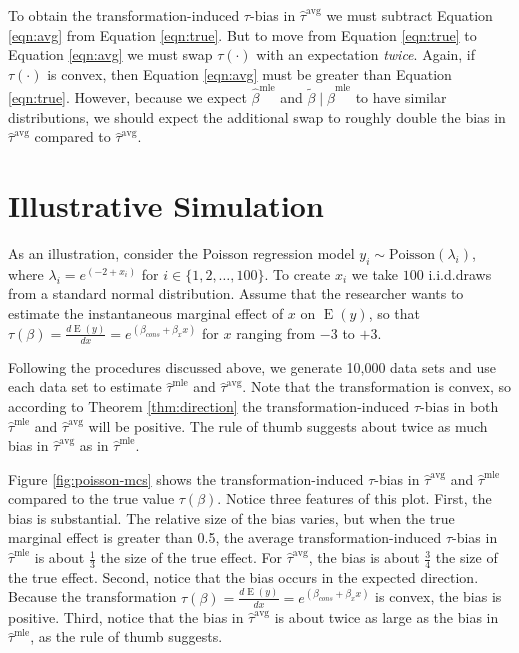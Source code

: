 \documentclass[11pt]{article}
\DeclareMathOperator*{\E}{\text{E}}
\begin{document}
To obtain the transformation-induced $\tau$-bias in $\hat{\tau}^\text{avg}$ we must subtract Equation \ref{eqn:avg} from Equation \ref{eqn:true}.
But to move from Equation \ref{eqn:true} to Equation \ref{eqn:avg} we must swap $\tau(\cdot)$ with an expectation \emph{twice}.
Again, if $\tau(\cdot)$ is convex, then Equation \ref{eqn:avg} must be greater than Equation \ref{eqn:true}.
However, because we expect $\hat{\beta}^\text{mle}$ and $\tilde{\beta} \mid \hat{\beta}^\text{mle}$ to have similar distributions, we should expect the additional swap to roughly double the bias in $\hat{\tau}^\text{avg}$ compared to $\hat{\tau}^\text{avg}$.

\section*{Illustrative Simulation}


As an illustration, consider the Poisson regression model $y_i \sim \text{Poisson}(\lambda_i)$, where $\lambda_i = e^{(-2 + x_i)}$ for $i \in \{1, 2,\ldots, 100\}$.
To create $x_i$ we take $100$ i.i.d.\@ draws from a standard normal distribution.
Assume that the researcher wants to estimate the instantaneous marginal effect of $x$ on $\E(y)$, so that $\tau(\beta) = \frac{d \E (y)}{dx} = e^{(\beta_{cons} + \beta_x x)}$ for $x$ ranging from $-3$ to $+3$.

Following the procedures discussed above, we generate 10,000 data sets and use each data set to estimate $\hat{\tau}^\text{mle}$ and $\hat{\tau}^\text{avg}$.
Note that the transformation is convex, so according to Theorem \ref{thm:direction} the transformation-induced $\tau$-bias in both $\hat{\tau}^\text{mle}$ and $\hat{\tau}^\text{avg}$ will be positive.
The rule of thumb suggests about twice as much bias in $\hat{\tau}^\text{avg}$ as in $\hat{\tau}^\text{mle}$.

Figure \ref{fig:poisson-mcs} shows the transformation-induced $\tau$-bias in $\hat{\tau}^\text{avg}$ and $\hat{\tau}^\text{mle}$ compared to the true value $\tau(\beta)$.
Notice three features of this plot.
First, the bias is substantial.
The relative size of the bias varies, but when the true marginal effect is greater than 0.5, the average transformation-induced $\tau$-bias in $\hat{\tau}^\text{mle}$ is about $\frac{1}{3}$ the size of the true effect.
For $\hat{\tau}^\text{avg}$, the bias is about $\frac{3}{4}$ the size of the true effect.
Second, notice that the bias occurs in the expected direction.
Because the transformation $\tau(\beta) = \frac{d \E (y)}{dx} = e^{(\beta_{cons} + \beta_x x)}$ is convex, the bias is positive.
Third, notice that the bias in $\hat{\tau}^\text{avg}$ is about twice as large as the bias in $\hat{\tau}^\text{mle}$, as the rule of thumb suggests.
\end{document}
